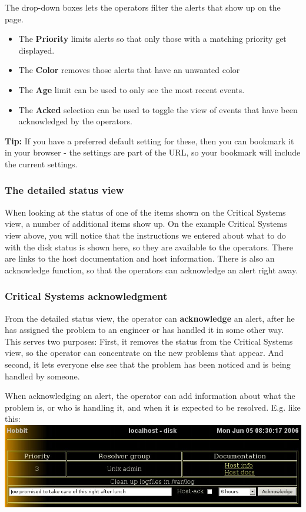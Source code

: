  The drop-down boxes lets the operators filter the alerts that show up on the page. \begin{itemize}
\item The \textbf{Priority}
 limits alerts so that only those with a matching priority get displayed.
\item The \textbf{Color}
 removes those alerts that have an unwanted color
\item The \textbf{Age}
 limit can be used to only see the most recent events.
\item The \textbf{Acked}
 selection can be used to toggle the view of events that have been acknowledged by the operators. 

\end{itemize}



 \textbf{Tip:}
 If you have a preferred default setting for these, then you can bookmark it in your browser - the settings are part of the URL, so your bookmark will include the current settings.
\subsubsection*{The detailed status view}


 When looking at the status of one of the items shown on the Critical Systems view, a number of additional items show up. On the example Critical Systems view above, you will notice that the instructions we entered about what to do with the disk status is shown here, so they are available to the operators. There are links to the host documentation and host information. There is also an acknowledge function, so that the operators can acknowledge an alert right away.
\subsubsection*{Critical Systems acknowledgment}


 From the detailed status view, the operator can \textbf{acknowledge}
 an alert, after he has assigned the problem to an engineer or has handled it in some other way. This serves two purposes: First, it removes the status from the Critical Systems view, so the operator can concentrate on the new problems that appear. And second, it lets everyone else see that the problem has been noticed and is being handled by someone.


 When acknowledging an alert, the operator can add information about what the problem is, or who is handling it, and when it is expected to be resolved. E.g. like this:\\ 
\includegraphics[scale=1]{./critview-detail-ackform.png} 


